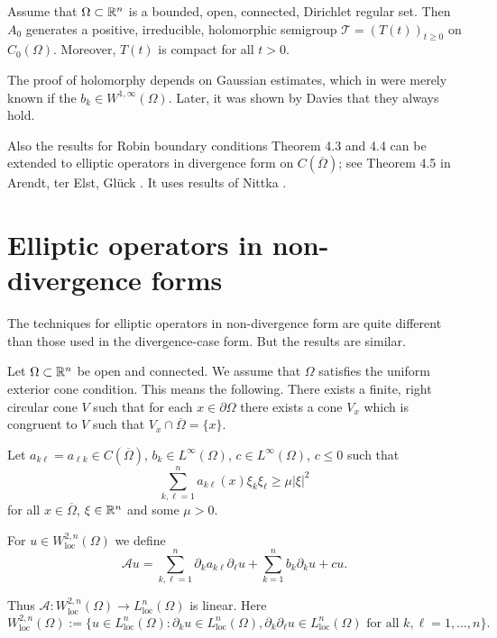 \begin{theorem}[4.5]
Assume that $\Omega \subset \mathbb{R}^n$ is a bounded, open, connected, Dirichlet regular set. Then $A_0$ generates a positive, irreducible, holomorphic semigroup $\mathcal{T} = (T(t))_{t \geq 0}$ on $C_0(\Omega)$. Moreover, $T(t)$ is compact for all $t > 0$.
\end{theorem}

\begin{remark}
The proof of holomorphy depends on Gaussian estimates, which in \cite{ArBe99} were merely known if the $b_k \in W^{1,\infty}(\Omega)$. Later, it was shown by Davies \cite{Da00} that they always hold.
\end{remark}

Also the results for Robin boundary conditions Theorem 4.3 and 4.4 can be extended to elliptic operators in divergence form on $C(\overline{\Omega})$; see Theorem 4.5 in Arendt, ter Elst, Glück \cite{AEG20}. It uses results of Nittka \cite{Ni11}.

\section{Elliptic operators in non-divergence forms}

The techniques for elliptic operators in non-divergence form are quite different than those used in the divergence-case form. But the results are similar.

Let $\Omega \subset \mathbb{R}^n$ be open and connected. We assume that $\Omega$ satisfies the uniform exterior cone condition. This means the following. There exists a finite, right circular cone $V$ such that for each $x \in \partial\Omega$ there exists a cone $V_x$ which is congruent to $V$ such that $V_x \cap \overline{\Omega} = \{x\}$.

Let $a_{k\ell} = a_{\ell k} \in C(\overline{\Omega})$, $b_k \in L^\infty(\Omega)$, $c \in L^\infty(\Omega)$, $c \leq 0$ such that
\[\sum_{k,\ell=1}^n a_{k\ell}(x)\xi_k\xi_\ell \geq \mu|\xi|^2\]
for all $x \in \overline{\Omega}$, $\xi \in \mathbb{R}^n$ and some $\mu > 0$.

For $u \in W^{2,n}_{\text{loc}}(\Omega)$ we define
\[\mathcal{A}u = \sum_{k,\ell=1}^n \partial_k a_{k\ell} \partial_\ell u + \sum_{k=1}^n b_k \partial_k u + cu.\]

Thus $\mathcal{A} : W^{2,n}_{\text{loc}}(\Omega) \to L^n_{\text{loc}}(\Omega)$ is linear. Here
\[W^{2,n}_{\text{loc}}(\Omega) := \{u \in L^n_{\text{loc}}(\Omega) : \partial_k u \in L^n_{\text{loc}}(\Omega), \partial_k \partial_\ell u \in L^n_{\text{loc}}(\Omega) \text{ for all } k, \ell = 1, \ldots, n\}.\]

